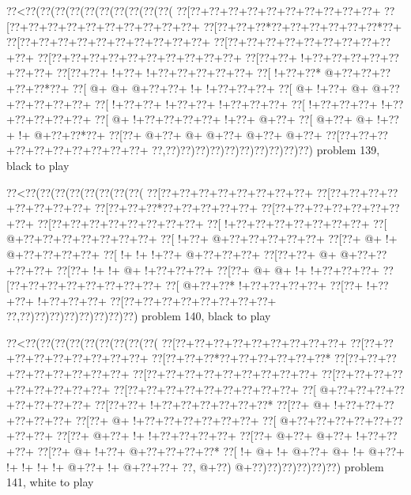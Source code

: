 \vbox{\vbox{\goo
\0??<\0??(\0??(\0??(\0??(\0??(\0??(\0??(\0??(\0??(\0??(
\0??[\0??+\0??+\0??+\0??+\0??+\0??+\0??+\0??+\0??+\0??+
\0??[\0??+\0??+\0??+\0??+\0??+\0??+\0??+\0??+\0??+\0??+
\0??[\0??+\0??+\0??*\0??+\0??+\0??+\0??+\0??+\0??*\0??+
\0??[\0??+\0??+\0??+\0??+\0??+\0??+\0??+\0??+\0??+\0??+
\0??[\0??+\0??+\0??+\0??+\0??+\0??+\0??+\0??+\0??+\0??+
\0??[\0??+\0??+\0??+\0??+\0??+\0??+\0??+\0??+\0??+\0??+
\0??[\0??+\0??+\- !+\0??+\0??+\0??+\0??+\0??+\0??+\0??+
\0??[\0??+\0??+\- !+\0??+\- !+\0??+\0??+\0??+\0??+\0??+
\0??[\- !+\0??+\0??*\- @+\0??+\0??+\0??+\0??+\0??*\0??+
\0??[\- @+\- @+\- @+\0??+\0??+\- !+\- !+\0??+\0??+\0??+
\0??[\- @+\- !+\0??+\- @+\- @+\0??+\0??+\0??+\0??+\0??+
\0??[\- !+\0??+\0??+\- !+\0??+\0??+\- !+\0??+\0??+\0??+
\0??[\- !+\0??+\0??+\0??+\- !+\0??+\0??+\0??+\0??+\0??+
\0??[\- @+\- !+\0??+\0??+\0??+\0??+\- !+\0??+\- @+\0??+
\0??[\- @+\0??+\- @+\- !+\0??+\- !+\- @+\0??+\0??*\0??+
\0??[\0??+\- @+\0??+\- @+\- @+\0??+\- @+\0??+\- @+\0??+
\0??[\0??+\0??+\0??+\0??+\0??+\0??+\0??+\0??+\0??+\0??+
\0??,\0??)\0??)\0??)\0??)\0??)\0??)\0??)\0??)\0??)\0??)
}
\hfil problem 139, black to play\hfil\break
}

\vbox{\vbox{\goo
\0??<\0??(\0??(\0??(\0??(\0??(\0??(\0??(\0??(
\0??[\0??+\0??+\0??+\0??+\0??+\0??+\0??+\0??+
\0??[\0??+\0??+\0??+\0??+\0??+\0??+\0??+\0??+
\0??[\0??+\0??+\0??*\0??+\0??+\0??+\0??+\0??+
\0??[\0??+\0??+\0??+\0??+\0??+\0??+\0??+\0??+
\0??[\0??+\0??+\0??+\0??+\0??+\0??+\0??+\0??+
\0??[\- !+\0??+\0??+\0??+\0??+\0??+\0??+\0??+
\0??[\- @+\0??+\0??+\0??+\0??+\0??+\0??+\0??+
\0??[\- !+\0??+\- @+\0??+\0??+\0??+\0??+\0??+
\0??[\0??+\- @+\- !+\- @+\0??+\0??+\0??+\0??+
\0??[\- !+\- !+\- !+\0??+\- @+\0??+\0??+\0??+
\0??[\0??+\0??+\- @+\- @+\0??+\0??+\0??+\0??+
\0??[\0??+\- !+\- !+\- @+\- !+\0??+\0??+\0??+
\0??[\0??+\- @+\- @+\- !+\- !+\0??+\0??+\0??+
\0??[\0??+\0??+\0??+\0??+\0??+\0??+\0??+\0??+
\0??[\- @+\0??+\0??*\- !+\0??+\0??+\0??+\0??+
\0??[\0??+\- !+\0??+\0??+\- !+\0??+\0??+\0??+
\0??[\0??+\0??+\0??+\0??+\0??+\0??+\0??+\0??+
\0??,\0??)\0??)\0??)\0??)\0??)\0??)\0??)\0??)
}
\hfil problem 140, black to play\hfil\break
}

\vbox{\vbox{\goo
\0??<\0??(\0??(\0??(\0??(\0??(\0??(\0??(\0??(\0??(
\0??[\0??+\0??+\0??+\0??+\0??+\0??+\0??+\0??+\0??+
\0??[\0??+\0??+\0??+\0??+\0??+\0??+\0??+\0??+\0??+
\0??[\0??+\0??+\0??*\0??+\0??+\0??+\0??+\0??+\0??*
\0??[\0??+\0??+\0??+\0??+\0??+\0??+\0??+\0??+\0??+
\0??[\0??+\0??+\0??+\0??+\0??+\0??+\0??+\0??+\0??+
\0??[\0??+\0??+\0??+\0??+\0??+\0??+\0??+\0??+\0??+
\0??[\0??+\0??+\0??+\0??+\0??+\0??+\0??+\0??+\0??+
\0??[\- @+\0??+\0??+\0??+\0??+\0??+\0??+\0??+\0??+
\0??[\0??+\0??+\- !+\0??+\0??+\0??+\0??+\0??+\0??*
\0??[\0??+\- @+\- !+\0??+\0??+\0??+\0??+\0??+\0??+
\0??[\0??+\- @+\- !+\0??+\0??+\0??+\0??+\0??+\0??+
\0??[\- @+\0??+\0??+\0??+\0??+\0??+\0??+\0??+\0??+
\0??[\0??+\- @+\0??+\- !+\- !+\0??+\0??+\0??+\0??+
\0??[\0??+\- @+\0??+\- @+\0??+\- !+\0??+\0??+\0??+
\0??[\0??+\- @+\- !+\0??+\- @+\0??+\0??+\0??+\0??*
\0??[\- !+\- @+\- !+\- @+\0??+\- @+\- !+\- @+\0??+
\- !+\- !+\- !+\- !+\- @+\0??+\- !+\- @+\0??+\0??+
\0??,\- @+\0??)\- @+\0??)\0??)\0??)\0??)\0??)\0??)
}
\hfil problem 141, white to play\hfil\break
}

